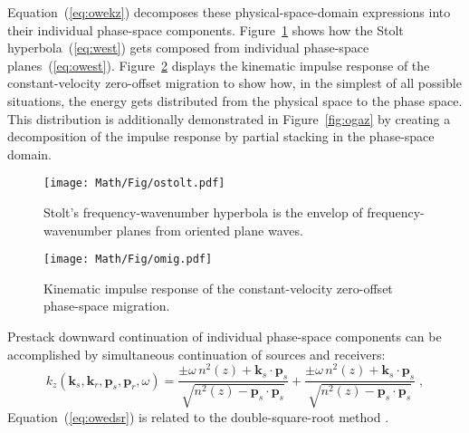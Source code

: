 Equation~(\ref{eq:owekz}) decomposes these physical-space-domain expressions
into their individual phase-space components. Figure~\ref{fig:ostolt} shows
how the Stolt hyperbola~(\ref{eq:west}) gets composed from individual
phase-space planes~(\ref{eq:owest}). Figure~\ref{fig:omig} displays the
kinematic impulse response of the constant-velocity zero-offset migration to
show how, in the simplest of all possible situations, the energy gets
distributed from the physical space to the phase space. This distribution is
additionally demonstrated in Figure~\ref{fig:ogaz} by creating a decomposition
of the impulse response by partial stacking in the phase-space domain.

\begin{figure}[htbp]
\centering
\texttt{[image: Math/Fig/ostolt.pdf]}
\caption{Stolt's frequency-wavenumber hyperbola
  is the envelop of frequency-wavenumber planes from oriented plane waves.}
\label{fig:ostolt}
\end{figure}

\begin{figure}[htbp]
\centering
\texttt{[image: Math/Fig/omig.pdf]}
\caption{Kinematic impulse response of the
  constant-velocity zero-offset phase-space migration.}
\label{fig:omig}
\end{figure}


Prestack downward continuation of individual phase-space components can be
accomplished by simultaneous continuation of sources and receivers:
\begin{equation}
  \label{eq:owedsr}
  k_z(\mathbf{k}_s,\mathbf{k}_r,\mathbf{p}_s,\mathbf{p}_r,\omega) = 
  \frac{\pm \omega\,n^2(z) + \mathbf{k}_s \cdot \mathbf{p}_s}
  {\sqrt{n^2(z)-\mathbf{p}_s \cdot \mathbf{p}_s}}
  + \frac{\pm \omega\,n^2(z) + \mathbf{k}_s \cdot \mathbf{p}_s}
  {\sqrt{n^2(z)-\mathbf{p}_s \cdot \mathbf{p}_s}}\;,
\end{equation}
Equation~(\ref{eq:owedsr}) is related to the double-square-root method
\cite[]{iei}.

